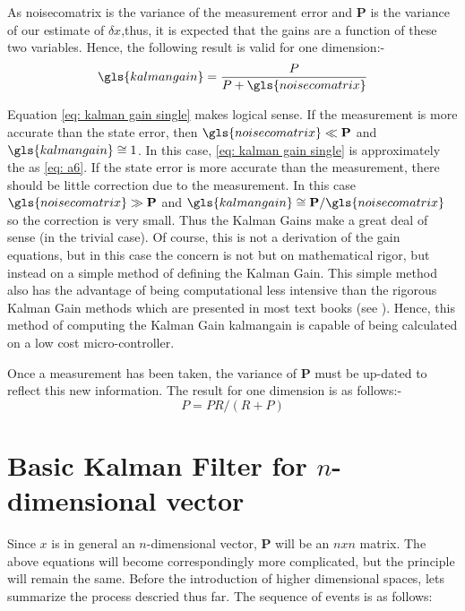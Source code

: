 As \gls{noisecomatrix} is the variance of the measurement error and {\bf P}  is the variance of our estimate of $\delta x$,thus, it is expected that the gains are a function of these two variables. Hence, the following result is valid for one dimension:-
\begin{equation}
\gls{kalmangain} = \frac{P}{P + \gls{noisecomatrix}} \label{eq: kalman gain single}
\end{equation}
 
Equation \ref{eq: kalman gain single} makes logical sense. If the measurement is more accurate than the state error, then $\gls{noisecomatrix} \ll {\bf P}$ and $\gls{kalmangain} \cong 1$. In this case, \eqref{eq: kalman gain single} is approximately the as \eqref{eq: a6}. If the state error is more accurate than the measurement, there should be little correction due to the measurement. In this case $\gls{noisecomatrix} \gg {\bf P}$ and $\gls{kalmangain}\cong {\bf P}/\gls{noisecomatrix}$ so the correction is very small. Thus the Kalman Gains make a great deal of sense (in the trivial case). Of course, this is not a derivation of the gain equations, but in this case the concern is not but on mathematical rigor, but instead on a simple method of defining the Kalman Gain. This simple method also has the advantage of being computational less intensive than the rigorous Kalman Gain methods which are presented in most text books (see \cite[pg 791-794]{Artofcontrol}). Hence, this method of computing the Kalman Gain \gls{kalmangain} is capable of being calculated on a low cost micro-controller.    

Once a measurement has been taken, the variance of {\bf P} must be up-dated to reflect this new information. The result for one dimension is as follows:-
\begin{equation}
P = PR/(R+P) \label{eq:a8}
\end{equation}


	
\newpage
\section{Basic Kalman Filter for $n$-dimensional vector}
Since $x$ is in general an $n$-dimensional vector, {\bf P} will be an $nxn$ matrix. The above equations will become correspondingly more complicated, but the principle will remain the same. Before the introduction of higher dimensional spaces, lets summarize the process descried thus far. The sequence of events is as follows:


